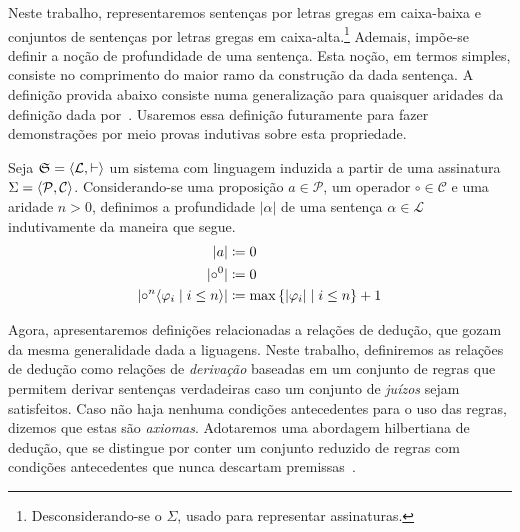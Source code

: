 \vspace{.5\baselineskip}
Neste trabalho, representaremos sentenças por letras gregas em caixa-baixa e conjuntos de sentenças por letras gregas em caixa-alta.\footnote{Desconsiderando-se o $\Sigma$, usado para representar assinaturas.}
Ademais, impõe-se definir a noção de profundidade de uma sentença.
Esta noção, em termos simples, consiste no comprimento do maior ramo da construção da dada sentença.
A definição provida abaixo consiste numa generalização para quaisquer aridades da definição dada por~\cite{Troelstra+Schwichtenberg.2000}.
Usaremos essa definição futuramente para fazer demonstrações por meio provas indutivas sobre esta propriedade.

\vspace{.5\baselineskip}
\begin{tcolorbox}[enhanced jigsaw, breakable, sharp corners, colframe=black, colback=white, boxrule=0.5pt, left=1.5mm, right=1.5mm, top=1.5mm, bottom=1.5mm]
\begin{definition}[Profundidade]
    Seja $\mathfrak{S} = \langle\mathcal{L}, \vdash\rangle$ um sistema com linguagem induzida a partir de uma assinatura $\Sigma=\langle\mathcal{P},\mathcal{C}\rangle$. Considerando-se uma proposição $a\in\mathcal{P}$, um operador ${\circ}\in\mathcal{C}$ e uma aridade $n>0$, definimos a profundidade $|\alpha|$ de uma sentença $\alpha\in\mathcal{L}$ indutivamente da maneira que segue.
    \begin{align*}
        |a|&\coloneqq 0\\
        |{\circ^0}|&\coloneqq 0\\
        |{\circ^n\langle\varphi_i\mid i\leq n\rangle}|&\coloneqq\max\left\{|\varphi_i|\mid i\leq n\right\}+1
    \end{align*}
\end{definition}
\end{tcolorbox}

\vspace{.5\baselineskip}
Agora, apresentaremos definições relacionadas a relações de dedução, que gozam da mesma generalidade dada a liguagens.
Neste trabalho, definiremos as relações de dedução como relações de \emph{derivação} baseadas em um conjunto de regras que permitem derivar sentenças verdadeiras caso um conjunto de \emph{juízos} sejam satisfeitos.
Caso não haja nenhuma condições antecedentes para o uso das regras, dizemos que estas são \emph{axiomas}.
Adotaremos uma abordagem hilbertiana de dedução, que se distingue por conter um conjunto reduzido de regras com condições antecedentes que nunca descartam premissas~\citep{Troelstra+Schwichtenberg.2000}.


